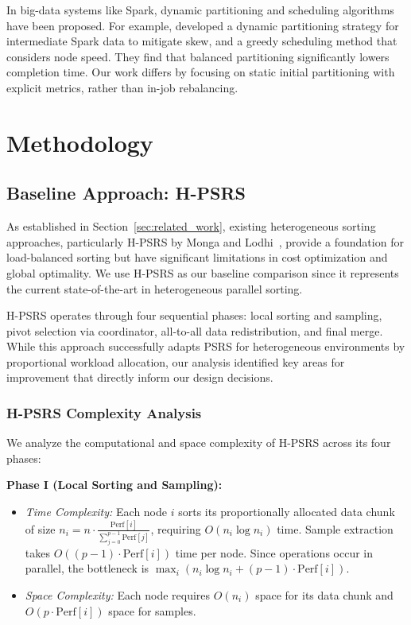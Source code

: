 \documentclass[]{interact}
\theoremstyle{plain}
\theoremstyle{definition}
\theoremstyle{remark}
\begin{document}
In big-data systems like Spark, dynamic partitioning and scheduling algorithms have been proposed. For example,\cite{lu_time_aware_2023} developed a dynamic partitioning strategy for intermediate Spark data to mitigate skew, and a greedy scheduling method that considers node speed. They find that balanced partitioning significantly lowers completion time. Our work differs by focusing on static initial partitioning with explicit metrics, rather than in-job rebalancing.

\section{Methodology}

\subsection{Baseline Approach: H-PSRS}
\label{sec:baseline}

As established in Section~\ref{sec:related_work}, existing heterogeneous sorting approaches, particularly H-PSRS by Monga and Lodhi~\cite{monga_parallel_heterogeneous}, provide a foundation for load-balanced sorting but have significant limitations in cost optimization and global optimality. We use H-PSRS as our baseline comparison since it represents the current state-of-the-art in heterogeneous parallel sorting.

H-PSRS operates through four sequential phases: local sorting and sampling, pivot selection via coordinator, all-to-all data redistribution, and final merge. While this approach successfully adapts PSRS for heterogeneous environments by proportional workload allocation, our analysis identified key areas for improvement that directly inform our design decisions.

\subsubsection{H-PSRS Complexity Analysis}

We analyze the computational and space complexity of H-PSRS across its four phases:

\textbf{Phase I (Local Sorting and Sampling):}
\begin{itemize}
\item \textit{Time Complexity:} Each node $i$ sorts its proportionally allocated data chunk of size $n_i = n \cdot \frac{\text{Perf}[i]}{\sum_{j=0}^{p-1} \text{Perf}[j]}$, requiring $O(n_i \log n_i)$ time. Sample extraction takes $O((p-1) \cdot \text{Perf}[i])$ time per node. Since operations occur in parallel, the bottleneck is $\max_i(n_i \log n_i + (p-1) \cdot \text{Perf}[i])$.
\item \textit{Space Complexity:} Each node requires $O(n_i)$ space for its data chunk and $O(p \cdot \text{Perf}[i])$ space for samples.
\end{itemize}
\end{document}

